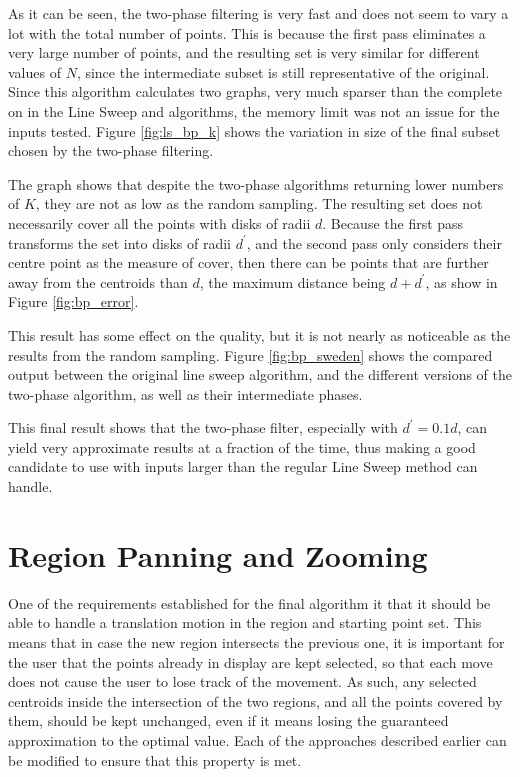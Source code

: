 

As it can be seen, the two-phase filtering is very fast and does not seem to vary a lot with the total number of points. This is because the first pass eliminates a very large number of points, and the resulting set is very similar for different values of $N$, since the intermediate subset is still representative of the original. Since this algorithm calculates two graphs, very much sparser than the complete on in the Line Sweep and \kdtree algorithms, the memory limit was not an issue for the inputs tested. Figure \ref{fig:ls_bp_k} shows the variation in size of the final subset chosen by the two-phase filtering.



The graph shows that despite the two-phase algorithms returning lower numbers of $K$, they are not as low as the random sampling. The resulting set does not necessarily cover all the points with disks of radii $d$. Because the first pass transforms the set into disks of radii $d^\prime$, and the second pass only considers their centre point as the measure of cover, then there can be points that are further away from the centroids than $d$, the maximum distance being $d+d^\prime$, as show in Figure \ref{fig:bp_error}.



This result has some effect on the quality, but it is not nearly as noticeable as the results from the random sampling. Figure \ref{fig:bp_sweden} shows the compared output between the original line sweep algorithm, and the different versions of the two-phase algorithm, as well as their intermediate phases.


This final result shows that the two-phase filter, especially with $d^\prime=0.1d$, can yield very approximate results at a fraction of the time, thus making a good candidate to use with inputs larger than the regular Line Sweep method can handle.



\section{Region Panning and Zooming}
One of the requirements established for the final algorithm it that it should be able to handle a translation motion in the region and starting point set. This means that in case the new region intersects the previous one, it is important for the user that the points already in display are kept selected, so that each move does not cause the user to lose track of the movement. As such, any selected centroids inside the intersection of the two regions, and all the points covered by them, should be kept unchanged, even if it means losing the guaranteed approximation to the optimal value. Each of the approaches described earlier can be modified to ensure that this property is met. 

